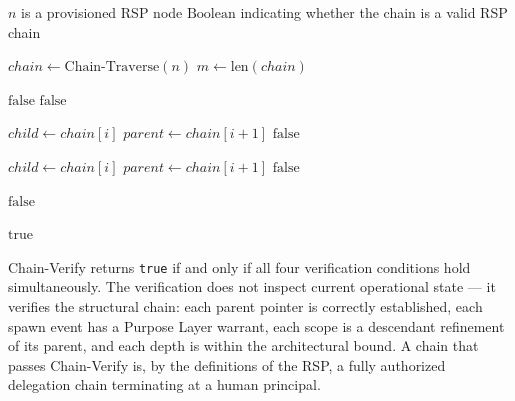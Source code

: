 \begin{algorithm}
\caption{Chain-Verify($n$) — Verify the authorization chain from node $n$ to human anchor}
\label{alg:chain-verify}
\begin{algorithmic}[1]
\REQUIRE $n$ is a provisioned RSP node
\ENSURE $\text{Boolean}$ indicating whether the chain is a valid RSP chain

\STATE $chain \leftarrow \text{Chain-Traverse}(n)$
\STATE $m \leftarrow \text{len}(chain)$

\STATE {}
    \STATE \RETURN $\text{false}$ 
\ENDIF
{}
    \STATE \RETURN $\text{false}$ 
\ENDIF

\STATE {}
    \STATE $child \leftarrow chain[i]$
    \STATE $parent \leftarrow chain[i+1]$
        \STATE \RETURN $\text{false}$ 
    \ENDIF
\ENDFOR

\STATE {}
    \STATE $child \leftarrow chain[i]$
    \STATE $parent \leftarrow chain[i+1]$
        \STATE \RETURN $\text{false}$ 
    \ENDIF
\ENDFOR

\STATE {}
        \STATE \RETURN $\text{false}$ 
    \ENDIF
\ENDFOR

\RETURN $\text{true}$
\end{algorithmic}
\end{algorithm}

Chain-Verify returns \texttt{true} if and only if all four verification conditions hold simultaneously. The verification does not inspect current operational state — it verifies the structural chain: each parent pointer is correctly established, each spawn event has a Purpose Layer warrant, each scope is a descendant refinement of its parent, and each depth is within the architectural bound. A chain that passes Chain-Verify is, by the definitions of the RSP, a fully authorized delegation chain terminating at a human principal.

